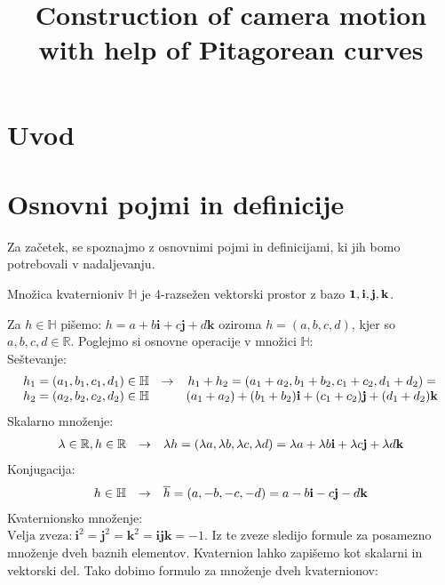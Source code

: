 \documentclass[mat1]{fmfdelo}
\title{Construction of camera motion with help of Pitagorean curves}
\newcommand{\R}{\mathbb R}
\newcommand{\HH}{\mathbb H}
\begin{document}
\section{Uvod}

\section{Osnovni pojmi in definicije}
Za začetek, se spoznajmo z osnovnimi pojmi in definicijami, ki jih bomo potrebovali v nadaljevanju.
\begin{definicija}
Množica kvaternioniv $\HH$ je 4-razsežen vektorski prostor z bazo $\bf{1},\bf{i},\bf{j},\bf{k}$.
\end{definicija}
Za $h\in \HH$ pišemo: $h = a + b\mathbf{i} + c\mathbf{j} + d\mathbf{k}$ oziroma $h=(a,b,c,d)$, kjer so $a,b,c,d\in \R$.
Poglejmo si osnovne operacije v množici $\HH$:\\
Seštevanje:
\begin{equation*}
\begin{array}{c c c}
h_1 = (a_1,b_1,c_1,d_1) \in \HH &  \rightarrow & h_1 + h_2 = (a_1+a_2,b_1+b_2,c_1+c_2,d_1+d_2) = \\
h_2 = (a_2,b_2,c_2,d_2) \in \HH &  & (a_1+a_2) + (b_1+b_2)\mathbf{i} + (c_1+c_2)\mathbf{j} + (d_1+d_2)\mathbf{k}
\end{array}
\end{equation*}
Skalarno množenje:
\begin{equation*}
\begin{array}{c c c}
\lambda \in \R, h \in \R & \rightarrow & \lambda h = (\lambda a, \lambda b, \lambda c, \lambda d) =  \lambda a + \lambda b \mathbf{i} + \lambda c \mathbf{j} + \lambda d \mathbf{k}
\end{array}
\end{equation*}
Konjugacija:
\begin{equation*}
\begin{array}{c c c}
h \in \HH & \rightarrow &\overline{h} = (a,-b,-c,-d)= a-b\mathbf{i} - c\mathbf{j} - d\mathbf{k}
\end{array}
\end{equation*}
Kvaternionsko množenje:\\
$\text{Velja zveza:}~\mathbf{i}^2 = \mathbf{j}^2 = \mathbf{k}^2 = \mathbf{ijk} = -1$. Iz te zveze sledijo formule za posamezno množenje dveh baznih elementov. Kvaternion lahko zapišemo kot skalarni in vektorski del. Tako dobimo formulo za množenje dveh kvaternionov:
\end{document}
